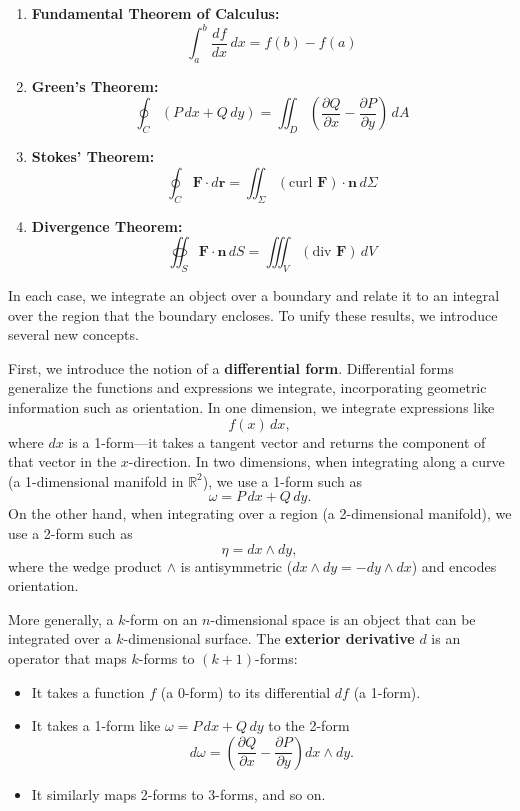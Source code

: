 \begin{enumerate}
    \item \textbf{Fundamental Theorem of Calculus:}
    \[
    \int_a^b \frac{df}{dx}\,dx = f(b) - f(a)
    \]
    
    \item \textbf{Green's Theorem:}
    \[
    \oint_C (P\,dx + Q\,dy) = \iint_D \left(\frac{\partial Q}{\partial x} - \frac{\partial P}{\partial y}\right)\,dA
    \]
    
    \item \textbf{Stokes' Theorem:}
    \[
    \oint_C \mathbf{F} \cdot d\mathbf{r} = \iint_\Sigma (\text{curl } \mathbf{F}) \cdot \mathbf{n}\,d\Sigma
    \]
    
    \item \textbf{Divergence Theorem:}
    \[
    \oiint_S \mathbf{F} \cdot \mathbf{n}\,dS = \iiint_V (\text{div } \mathbf{F})\,dV
    \]
\end{enumerate}

\noindent In each case, we integrate an object over a boundary and relate it to an integral over the region that the boundary encloses. To unify these results, we introduce several new concepts.

\noindent First, we introduce the notion of a \textbf{differential form}. Differential forms generalize the functions and expressions we integrate, incorporating geometric information such as orientation. In one dimension, we integrate expressions like
\[
f(x)\,dx,
\]
where \(dx\) is a 1-form—it takes a tangent vector and returns the component of that vector in the \(x\)-direction. In two dimensions, when integrating along a curve (a 1-dimensional manifold in \(\mathbb{R}^2\)), we use a 1-form such as
\[
\omega = P\,dx + Q\,dy.
\]
On the other hand, when integrating over a region (a 2-dimensional manifold), we use a 2-form such as
\[
\eta = dx \wedge dy,
\]
where the wedge product \(\wedge\) is antisymmetric (\(dx \wedge dy = -dy \wedge dx\)) and encodes orientation.

\noindent More generally, a \(k\)-form on an \(n\)-dimensional space is an object that can be integrated over a \(k\)-dimensional surface. The \textbf{exterior derivative} \(d\) is an operator that maps \(k\)-forms to \((k+1)\)-forms:
\begin{itemize}
    \item It takes a function \(f\) (a 0-form) to its differential \(df\) (a 1-form).
    \item It takes a 1-form like \(\omega = P\,dx + Q\,dy\) to the 2-form
    \[
    d\omega = \left(\frac{\partial Q}{\partial x} - \frac{\partial P}{\partial y}\right) dx \wedge dy.
    \]
    \item It similarly maps 2-forms to 3-forms, and so on.
\end{itemize}

